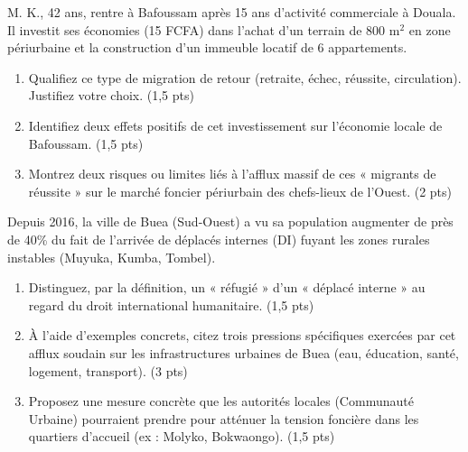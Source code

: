 \documentclass[11pt]{article}
\begin{document}
\begin{exercice}
\label{exo:ouest}
M. K., 42 ans, rentre à Bafoussam après 15 ans d'activité commerciale à Douala. Il investit ses économies (\SI{15}{\million} FCFA) dans l'achat d'un terrain de 800 m$^2$ en zone périurbaine et la construction d'un immeuble locatif de 6 appartements.

\begin{enumerate}
    \item Qualifiez ce type de migration de retour (retraite, échec, réussite, circulation). Justifiez votre choix. (1,5 pts)
    \item Identifiez deux effets positifs de cet investissement sur l'économie locale de Bafoussam. (1,5 pts)
    \item Montrez deux risques ou limites liés à l'afflux massif de ces « migrants de réussite » sur le marché foncier périurbain des chefs-lieux de l'Ouest. (2 pts)
\end{enumerate}
\end{exercice}

\begin{exercice}
\label{exo:buea}
Depuis 2016, la ville de Buea (Sud-Ouest) a vu sa population augmenter de près de 40\% du fait de l'arrivée de déplacés internes (DI) fuyant les zones rurales instables (Muyuka, Kumba, Tombel).

\begin{enumerate}
    \item Distinguez, par la définition, un « réfugié » d'un « déplacé interne » au regard du droit international humanitaire. (1,5 pts)
    \item À l'aide d'exemples concrets, citez trois pressions spécifiques exercées par cet afflux soudain sur les infrastructures urbaines de Buea (eau, éducation, santé, logement, transport). (3 pts)
    \item Proposez une mesure concrète que les autorités locales (Communauté Urbaine) pourraient prendre pour atténuer la tension foncière dans les quartiers d'accueil (ex : Molyko, Bokwaongo). (1,5 pts)
\end{enumerate}
\end{exercice}
\end{document}
